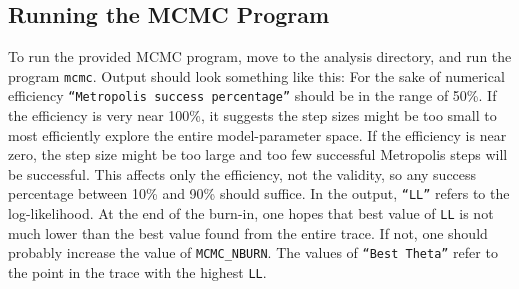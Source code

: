 \documentclass[UserManual.tex]{subfiles}
\begin{document}
\subsection{Running the MCMC Program}\label{subsec:mcmcrunning}
To run the provided MCMC program, move to the analysis directory, and run the program {\tt mcmc}. Output should look something like this:
\vspace*{-8pt}
For the sake of numerical efficiency {\tt ``Metropolis success percentage''} should be in the range of 50\%. If the efficiency is very near 100\%, it suggests the step sizes might be too small to most efficiently explore the entire model-parameter space. If the efficiency is near zero, the step size might be too large and too few successful Metropolis steps will be successful. This affects only the efficiency, not the validity, so any success percentage between 10\% and 90\% should suffice. In the output, {\tt ``LL''} refers to the log-likelihood. At the end of the burn-in, one hopes that best value of {\tt LL} is not much lower than the best value found from the entire trace. If not, one should probably increase the value of {\tt MCMC\_NBURN}. The values of {\tt ``Best Theta''} refer to the point in the trace with the highest {\tt LL}. 
\end{document}
